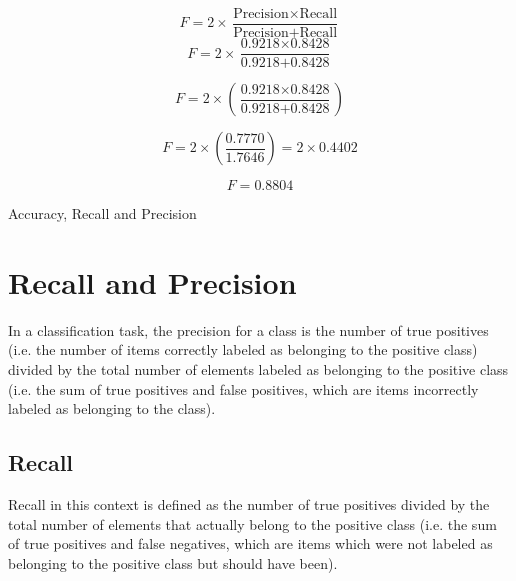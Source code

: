 \documentclass{article}
\begin{document}

	\[ F = 2 \times \frac{\mbox{Precision} \times \mbox{Recall}}{\mbox{Precision} + \mbox{Recall}}\]\bigskip
	\[ F = 2 \times \frac{\mbox{0.9218} \times \mbox{0.8428}}{\mbox{0.9218} + \mbox{0.8428}}\] 
	\bigskip


	
	\[ F = 2 \times \left( \frac{\mbox{0.9218} \times \mbox{0.8428}}{\mbox{0.9218} + \mbox{0.8428}} \right)\] 
	
	\[ F = 2 \times \left( \frac{0.7770}{1.7646} \right) = 2 \times 0.4402 \]
	{

		\[F = 0.8804\] 
	}
	



\begin{center}
\LARGE{Accuracy, Recall and Precision}
\end{center}

\section{Recall and Precision}
In a classification task, the precision for a class is the number of true positives (i.e. the number of items correctly labeled as belonging to the positive class) divided by the total number of elements labeled as belonging to the positive class (i.e. the sum of true positives and false positives, which are items incorrectly labeled as belonging to the class). 


\subsection*{Recall}
Recall in this context is defined as the number of true positives divided by the total number of elements that actually belong to the positive class (i.e. the sum of true positives and false negatives, which are items which were not labeled as belonging to the positive class but should have been).
\end{document}

